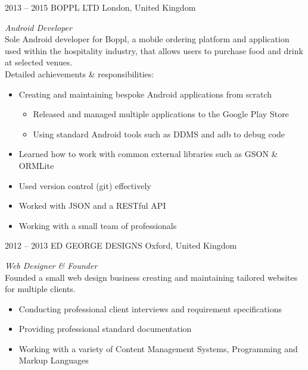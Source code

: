 \documentclass[]{friggeri-cv} %
\begin{document}
\begin{entrylist}
\entry
{2013 -- 2015}
{BOPPL LTD}
{London, United Kingdom}
{\emph{Android Developer} \\
Sole Android developer for Boppl, a mobile ordering platform and application used within the hospitality industry, that allows users to purchase food and drink at selected venues. \\
Detailed achievements \& responsibilities:
\begin{itemize}
\item Creating and maintaining bespoke Android applications from scratch
\begin{itemize}
\item Released and managed multiple applications to the Google Play Store
\item Using standard Android tools such as DDMS and adb to debug code
\end{itemize}
\item Learned how to work with common external libraries such as GSON \& ORMLite
\item Used version control (git) effectively
\item Worked with JSON and a RESTful API
\item Working with a small team of professionals
%
\end{itemize}}
\entry
{2012 -- 2013}
{ED GEORGE DESIGNS}
{Oxford, United Kingdom}
{\emph{Web Designer \& Founder} \\
Founded a small web design business creating and maintaining tailored websites for multiple clients.
\begin{itemize}
\item Conducting professional client interviews and requirement specifications
\item Providing professional standard documentation
\item Working with a variety of Content Management Systems, Programming and Markup Languages
\end{itemize}}

\end{entrylist}
\end{document}
